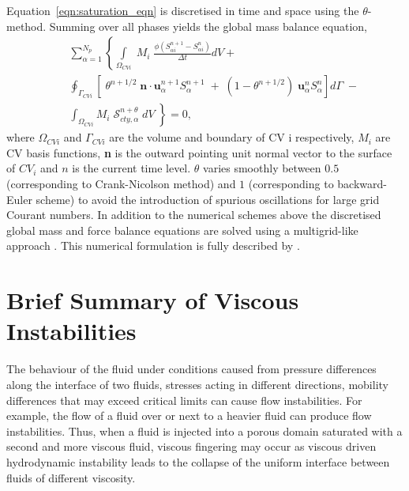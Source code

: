 \documentclass[preprint,authoryear,12pt]{elsarticle}
\begin{document}
Equation~\ref{eqn:saturation_eqn} is discretised in time and space using the $\theta$-method. Summing over all phases yields the global mass balance equation,
\begin{eqnarray}
 && \sum_{\alpha=1}^{N_{p}} \left\{\int\limits_{\Omega_{CVi}} \; M_{i} \; \frac{\phi\left(S_{\alpha i}^{n+1}-S_{\alpha i}^{n}\right)}{\Delta t} dV\right.  + \nonumber\\
 &&  \oint_{\Gamma_{CVi}} \left[\; \theta^{n+1/2}\; {\mathbf n}\cdot {\mathbf u}_{\alpha}^{n+1}S_{\alpha}^{n+1} \; + \; \left(1-\theta^{n+1/2}\right) \; {\mathbf u}_{\alpha}^{n}S_{\alpha}^{n}\right] d\Gamma \;- \nonumber\\
 &&  \left.\int_{\Omega_{CVi}} M_{i} \; \mathcal{S}_{cty,\alpha}^{n+\theta} \; dV\;\right\} =0,
\label{global_mass_balance}
\end{eqnarray}
where $\Omega_{CVi}$ and $\Gamma_{CVi}$ are the volume and boundary of CV i respectively, $M_{i}$ are CV basis functions, \textbf{n} is the outward pointing unit normal vector to the surface of $CV_{i}$ and $n$ is the current time level. $\theta$ varies smoothly between $0.5$ (corresponding to Crank-Nicolson method) and $1$ (corresponding to backward-Euler scheme) to avoid the introduction of spurious oscillations for large grid Courant numbers. In addition to the numerical schemes above the discretised global mass and force balance equations are solved using a multigrid-like approach \citep[see][]{pavlidis2016}. This numerical formulation is fully described by \citet{gomes_2017}\citep[see also][]{salinas2015,adam_2016}. 

\section{Brief Summary of Viscous Instabilities}\label{section:ViscousInstabilities}

\medskip
The behaviour of the fluid under conditions caused from pressure differences along the interface of two fluids, stresses acting in different directions, mobility differences that may exceed critical limits can cause flow instabilities. For example, the flow of a fluid over or next to a heavier fluid can produce flow instabilities. Thus, when a fluid is injected into a porous domain saturated with a second and more viscous fluid, viscous fingering may occur as viscous driven hydrodynamic instability leads to the collapse of the uniform interface between fluids of different viscosity. 
\end{document}
